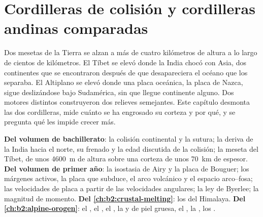 \chapter{Cordilleras de colisión y cordilleras andinas comparadas}\label{ch:b2:himalaya-andes}

Dos mesetas de la Tierra se alzan a más de cuatro kilómetros de altura a lo largo de cientos de kilómetros.
El Tíbet se elevó donde la India chocó con Asia, dos continentes que se encontraron después de que desapareciera el océano que
los separaba. El Altiplano se elevó donde una placa oceánica, la placa de Nazca, sigue deslizándose
bajo Sudamérica, sin que llegue continente alguno. Dos motores distintos construyeron dos
relieves semejantes. Este capítulo desmonta las dos cordilleras, mide cuánto se ha engrosado su corteza
y por qué, y se pregunta qué les impide crecer más.

\begin{recall}
\textbf{Del volumen de bachillerato}: la colisión continental y la sutura; la deriva de la India
hacia el norte, su frenado y la edad discutida de la colisión; la meseta del Tíbet, de unos
\qty{4600}{m} de altura sobre una corteza de unos \qty{70}{km} de espesor. \textbf{Del volumen de primer año}:
la isostasia de Airy y la placa de Bouguer; los márgenes activos, la placa que subduce, el arco volcánico y
el espacio arco--fosa; las velocidades de placa a partir de las velocidades angulares; la ley de Byerlee; la magnitud
de momento. \textbf{Del \cref{ch:b2:crustal-melting}}: los  del Himalaya.
\textbf{Del \cref{ch:b2:alpine-orogen}}: el , el , el , la  y
de piel gruesa, el , la , los .
\end{recall}

